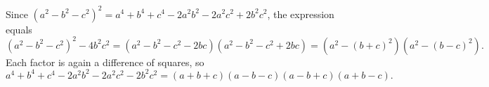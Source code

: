 Since $\left(a^2-b^2-c^2\right)^2=a^4+b^4+c^4-2a^2b^2-2a^2c^2+2b^2c^2$, the expression equals
\[\left(a^2-b^2-c^2\right)^2-4b^2c^2=\left(a^2-b^2-c^2-2bc\right)\left(a^2-b^2-c^2+2bc\right)=\left(a^2-(b+c)^2\right)\left(a^2-(b-c)^2\right).\]
Each factor is again a difference of squares, so
\[a^4+b^4+c^4-2a^2b^2-2a^2c^2-2b^2c^2=\boxed{(a+b+c)(a-b-c)(a-b+c)(a+b-c)}.\]
